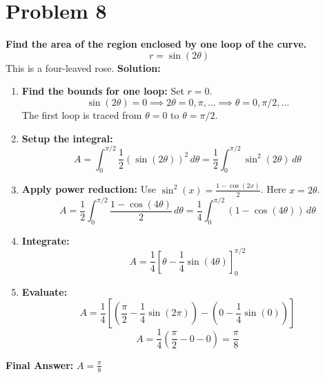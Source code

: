 \documentclass{article}
\begin{document}
\section*{Problem 8}
\textbf{Find the area of the region enclosed by one loop of the curve.}
\[ r = \sin(2\theta) \]
This is a four-leaved rose.
\textbf{Solution:}
\begin{enumerate}
    \item \textbf{Find the bounds for one loop:} Set $r=0$.
    \[ \sin(2\theta) = 0 \implies 2\theta = 0, \pi, \dots \implies \theta = 0, \pi/2, \dots \]
    The first loop is traced from $\theta=0$ to $\theta=\pi/2$.
    \item \textbf{Setup the integral:}
    \[ A = \int_{0}^{\pi/2} \frac{1}{2} (\sin(2\theta))^2 \,d\theta = \frac{1}{2} \int_{0}^{\pi/2} \sin^2(2\theta) \,d\theta \]
    \item \textbf{Apply power reduction:} Use $\sin^2(x) = \frac{1-\cos(2x)}{2}$. Here $x=2\theta$.
    \[ A = \frac{1}{2} \int_{0}^{\pi/2} \frac{1 - \cos(4\theta)}{2} \,d\theta = \frac{1}{4} \int_{0}^{\pi/2} (1 - \cos(4\theta)) \,d\theta \]
    \item \textbf{Integrate:}
    \[ A = \frac{1}{4} \left[ \theta - \frac{1}{4}\sin(4\theta) \right]_{0}^{\pi/2} \]
    \item \textbf{Evaluate:}
    \[ A = \frac{1}{4} \left[ \left(\frac{\pi}{2} - \frac{1}{4}\sin(2\pi)\right) - \left(0 - \frac{1}{4}\sin(0)\right) \right] \]
    \[ A = \frac{1}{4} \left( \frac{\pi}{2} - 0 - 0 \right) = \frac{\pi}{8} \]
\end{enumerate}
\textbf{Final Answer:} $A = \frac{\pi}{8}$
\newpage
\end{document}
